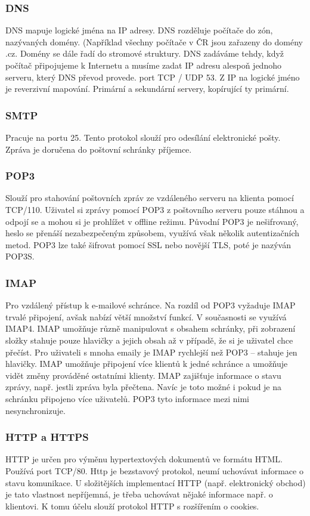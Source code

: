 \subsubsection{DNS}
DNS mapuje logické jména na IP adresy. DNS rozděluje počítače do zón, nazývaných domény.
(Například všechny počítače v ČR jsou zařazeny do domény .cz. Domény se dále řadí do stromové struktury. DNS zadáváme tehdy, když počítač připojujeme k Internetu a musíme zadat IP adresu alespoň jednoho serveru, který DNS převod provede. port TCP / UDP 53. Z IP na logické jméno je reverzivní mapování. Primární a sekundární servery, kopírující ty primární.

\subsubsection{SMTP}
Pracuje na portu 25. Tento protokol slouží pro odesílání elektronické pošty. Zpráva je doručena do poštovní schránky příjemce.
\subsubsection{POP3}
Slouží pro stahování poštovních zpráv ze vzdáleného serveru na klienta pomocí TCP/110. Uživatel si zprávy pomocí POP3 z poštovního serveru pouze stáhnou a odpojí se a mohou si je prohlížet v offline režimu. Původní POP3 je nešifrovaný, heslo se přenáší nezabezpečeným způsobem, využívá však několik autentizačních metod. POP3 lze také šifrovat pomocí SSL nebo novější TLS, poté je nazýván POP3S.

\subsubsection{IMAP}
Pro vzdálený přístup k e-mailové schránce. Na rozdíl od POP3 vyžaduje IMAP trvalé připojení, avšak nabízí větší množství funkcí. V současnosti se využívá IMAP4. IMAP umožňuje různě manipulovat s obsahem schránky, při zobrazení složky stahuje pouze hlavičky a jejich obsah až v případě, že si je uživatel chce přečíst. Pro uživateli s mnoha emaily je IMAP rychlejší než POP3 – stahuje jen hlavičky. IMAP umožňuje připojení více klientů k jedné schránce a umožňuje vidět změny prováděné ostatními klienty.
IMAP zajišťuje informace o stavu zprávy, např. jestli zpráva byla přečtena. Navíc je toto možné i pokud je na schránku připojeno více uživatelů. POP3 tyto informace mezi nimi nesynchronizuje.

\subsubsection{HTTP a HTTPS}
HTTP je určen pro výměnu hypertextových dokumentů ve formátu HTML. Používá port TCP/80. Http je bezstavový protokol, neumí uchovávat informace o stavu komunikace. U složitějších implementací HTTP (např. elektronický obchod) je tato vlastnost nepříjemná, je třeba uchovávat nějaké informace např. o klientovi. K tomu účelu slouží protokol HTTP s rozšířením o cookies.  

